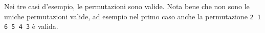 



\Examples

\begin{example}
\end{example}


\Explanation

Nei tre casi d'esempio, le permutazioni sono valide. Nota bene che non sono le uniche permutazioni valide,
ad esempio nel primo caso anche la permutazione \texttt{2 1 6 5 4 3} è valida.